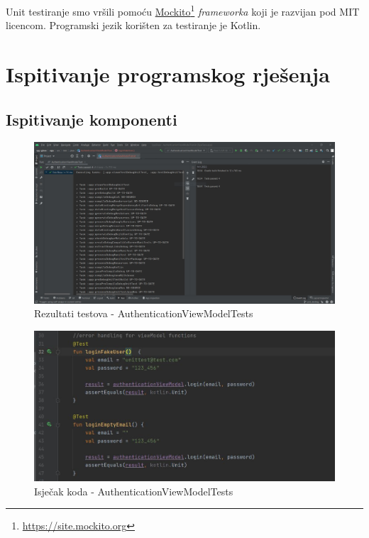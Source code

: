 		Unit testiranje smo vršili pomoću \underline{Mockito}\footnote{\url{https://site.mockito.org}} \textit{frameworka} koji je razvijan pod MIT licencom. Programski jezik korišten
		za testiranje je Kotlin.
		
			
			\eject 
		
	
		\section{Ispitivanje programskog rješenja}
			
			\subsection{Ispitivanje komponenti}
			
			\begin{figure}[H]
				\includegraphics[width=\textwidth]{slike/testResultsAuth.jpg}
				\caption{Rezultati testova - AuthenticationViewModelTests}
			\end{figure}
			
			\begin{figure}[H]
				\includegraphics[width=\textwidth]{slike/authTests1.jpg}
				\caption{Isječak koda - AuthenticationViewModelTests}
			\end{figure}
			
